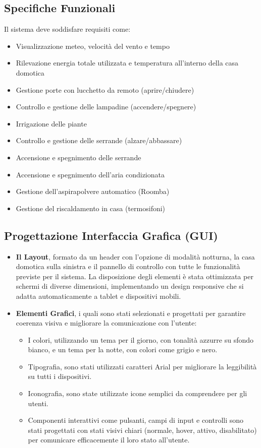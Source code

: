 \documentclass[a4paper,12pt]{article}
\begin{document}
\subsection{Specifiche Funzionali}
Il sistema deve soddisfare requisiti come:\begin{itemize}
    \item Visualizzazione meteo, velocità del vento e tempo
    \item Rilevazione energia totale utilizzata e temperatura all'interno della casa domotica
    \item Gestione porte con lucchetto da remoto (aprire/chiudere)
    \item Controllo e gestione delle lampadine (accendere/spegnere)
    \item Irrigazione delle piante
    \item Controllo e gestione delle serrande (alzare/abbassare)
    \item Accensione e spegnimento delle serrande
    \item Accensione e spegnimento dell'aria condizionata
    \item Gestione dell'aspirapolvere automatico (Roomba)
    \item Gestione del riscaldamento in casa (termosifoni)
\end{itemize}

\subsection{Progettazione Interfaccia Grafica (GUI)}
\begin{itemize}
    \item \textbf{Il Layout}, formato da un header con l'opzione di modalità notturna, la casa domotica sulla sinistra e il pannello di controllo con tutte le funzionalità previste per il sistema.
    La disposizione degli elementi è stata ottimizzata per schermi di diverse dimensioni, implementando un design responsive che si adatta automaticamente a tablet e dispositivi mobili.
    \item \textbf{Elementi Grafici}, i quali sono stati selezionati e progettati per garantire coerenza visiva e migliorare la comunicazione con l'utente:\begin{itemize}
        \item I colori, utilizzando un tema per il giorno, con tonalità azzurre su sfondo bianco, e un tema per la notte, con colori come grigio e nero.
        \item Tipografia, sono stati utilizzati caratteri Arial per migliorare la leggibilità su tutti i dispositivi.
        \item Iconografia, sono state utilizzate icone semplici da comprendere per gli utenti.
        \item Componenti interattivi come pulsanti, campi di input e controlli sono stati progettati con stati visivi chiari (normale, hover, attivo, disabilitato) per comunicare efficacemente il loro stato all'utente.
    \end{itemize}
\end{itemize}
\end{document}
